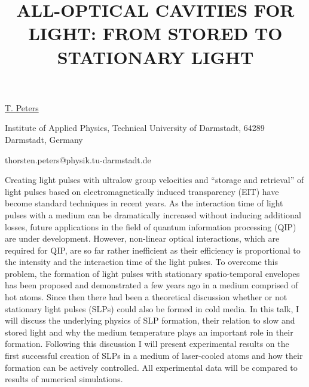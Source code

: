 \title{ALL-OPTICAL CAVITIES FOR LIGHT: FROM STORED TO STATIONARY LIGHT}

\underline{T. Peters} 

{\normalsize{\vspace{-4mm}
Institute of Applied Physics, Technical University of Darmstadt,
64289 Darmstadt, Germany

\email thorsten.peters@physik.tu-darmstadt.de}}

Creating light pulses with ultralow group velocities and ``storage and retrieval'' of light pulses based on electromagnetically induced transparency (EIT) have become standard techniques in recent years. As the interaction time of light pulses with a medium can be dramatically increased without inducing additional losses, future applications in the field of quantum information processing (QIP) are under development. However, non-linear optical interactions, which are required for QIP, are so far rather inefficient as their efficiency is proportional to the intensity and the interaction time of the light pulses.
To overcome this problem, the formation of light pulses with stationary spatio-temporal envelopes has been proposed and demonstrated a few years ago in a medium comprised of hot atoms. Since then there had been a theoretical discussion whether or not stationary light pulses (SLPs) could also be formed in cold media.
In this talk, I will discuss the underlying physics of SLP formation, their relation to slow and stored light and why the medium temperature plays an important role in their formation. Following this discussion I will present experimental results on the first successful creation of SLPs in a medium of laser-cooled atoms and how their formation can be actively controlled. All experimental data will be compared to results of numerical simulations.

\vspace{\baselineskip} 